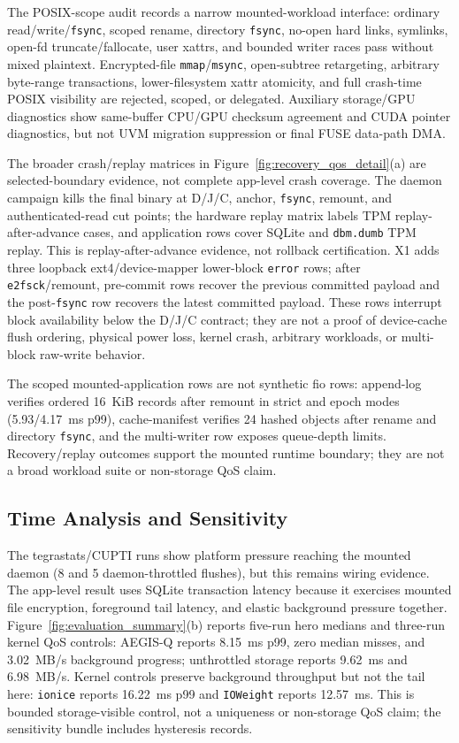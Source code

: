 The POSIX-scope audit records a narrow mounted-workload interface: ordinary read/write/\texttt{fsync}, scoped rename, directory \texttt{fsync}, no-open hard links, symlinks, open-fd truncate/fallocate, user xattrs, and bounded writer races pass without mixed plaintext.  Encrypted-file \texttt{mmap}/\texttt{msync}, open-subtree retargeting, arbitrary byte-range transactions, lower-filesystem xattr atomicity, and full crash-time POSIX visibility are rejected, scoped, or delegated.  Auxiliary storage/GPU diagnostics show same-buffer CPU/GPU checksum agreement and CUDA pointer diagnostics, but not UVM migration suppression or final FUSE data-path DMA.

The broader crash/replay matrices in Figure~\ref{fig:recovery_qos_detail}(a) are selected-boundary evidence, not complete app-level crash coverage.  The daemon campaign kills the final binary at D/J/C, anchor, \texttt{fsync}, remount, and authenticated-read cut points; the hardware replay matrix labels TPM replay-after-advance cases, and application rows cover SQLite and \texttt{dbm.dumb} TPM replay.  This is replay-after-advance evidence, not rollback certification.  X1 adds three loopback ext4/device-mapper lower-block \texttt{error} rows; after \texttt{e2fsck}/remount, pre-commit rows recover the previous committed payload and the post-\texttt{fsync} row recovers the latest committed payload.  These rows interrupt block availability below the D/J/C contract; they are not a proof of device-cache flush ordering, physical power loss, kernel crash, arbitrary workloads, or multi-block raw-write behavior.

The scoped mounted-application rows are not synthetic fio rows: append-log verifies ordered 16~KiB records after remount in strict and epoch modes (5.93/4.17~ms p99), cache-manifest verifies 24 hashed objects after rename and directory \texttt{fsync}, and the multi-writer row exposes queue-depth limits.  Recovery/replay outcomes support the mounted runtime boundary; they are not a broad workload suite or non-storage QoS claim.

\subsection{Time Analysis and Sensitivity}
\label{sec:eval_qos}

The tegrastats/CUPTI runs show platform pressure reaching the mounted daemon (8 and 5 daemon-throttled flushes), but this remains wiring evidence.  The app-level result uses SQLite transaction latency because it exercises mounted file encryption, foreground tail latency, and elastic background pressure together.  Figure~\ref{fig:evaluation_summary}(b) reports five-run hero medians and three-run kernel QoS controls: AEGIS-Q reports 8.15~ms p99, zero median misses, and 3.02~MB/s background progress; unthrottled storage reports 9.62~ms and 6.98~MB/s.  Kernel controls preserve background throughput but not the tail here: \texttt{ionice} reports 16.22~ms p99 and \texttt{IOWeight} reports 12.57~ms.  This is bounded storage-visible control, not a uniqueness or non-storage QoS claim; the sensitivity bundle includes hysteresis records.



